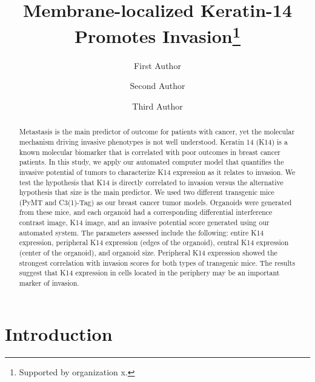 \documentclass[runningheads]{llncs}
\begin{document}
%
\title{Membrane-localized Keratin-14 Promotes Invasion\thanks{Supported by organization x.}}
%
%
\author{First Author  \and
Second Author \and
Third Author}
%
%
%
\maketitle              %
%
\begin{abstract}
Metastasis is the main predictor of outcome for patients with cancer, yet the molecular mechanism driving invasive phenotypes is not well understood. Keratin 14 (K14) is a known molecular biomarker that is correlated with poor outcomes in breast cancer patients. In this study, we apply our automated computer model that quantifies the invasive potential of tumors to characterize K14 expression as it relates to invasion. We test the hypothesis that K14 is directly correlated to invasion versus the alternative hypothesis that size is the main predictor. We used two different transgenic mice (PyMT and C3(1)-Tag) as our breast cancer tumor models. Organoids were generated from these mice, and each organoid had a corresponding differential interference contrast image, K14 image, and an invasive potential score generated using our automated system. The parameters assessed include the following: entire K14 expression, peripheral K14 expression (edges of the organoid), central K14 expression (center of the organoid), and organoid size. Peripheral K14 expression showed the strongest correlation with invasion scores for both types of transgenic mice. The results suggest that K14 expression in cells located in the periphery may be an important marker of invasion.

\end{abstract}
%
%
%
\section{Introduction}
\end{document}
